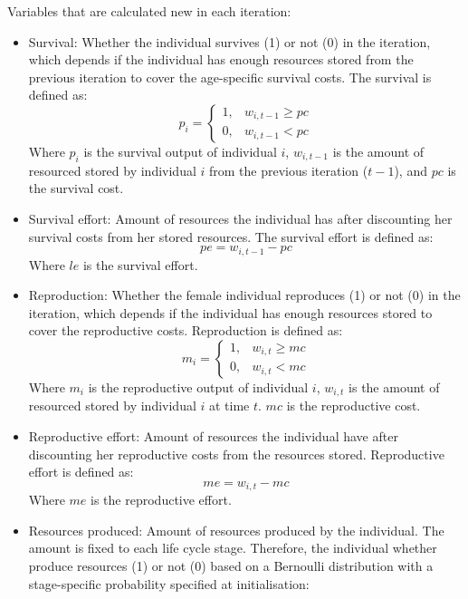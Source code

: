 \documentclass{article}
\begin{document}
Variables that are calculated new in each iteration:
    \begin{itemize}
        \item Survival: Whether the individual survives (1) or not (0) in the iteration, which depends if the individual has enough resources stored from the previous iteration to cover the age-specific survival costs. The survival is defined as:
\begin{equation}
    p_i=\begin{cases}
    1,& w_{i,t-1} \geq pc\\
    0,& w_{i,t-1} < pc
\end{cases}
\end{equation}
        Where $p_i$ is the survival output of individual $i$, $w_{i,t-1}$ is the amount of resourced stored by individual $i$ from the previous iteration ($t-1$), and $pc$ is the survival cost.
        \item Survival effort: Amount of resources the individual has after discounting her survival costs from her stored resources. The survival effort is defined as:
\begin{equation}
    pe=w_{i,t-1} - pc
\end{equation}
        Where $le$ is the survival effort.
        \item Reproduction: Whether the female individual reproduces (1) or not (0) in the iteration, which depends if the individual has enough resources stored to cover the reproductive costs. Reproduction is defined as:
\begin{equation}
    m_i=\begin{cases}
    1,& w_{i,t} \geq mc\\
    0,& w_{i,t} < mc
\end{cases}
\end{equation}
        Where $m_i$ is the reproductive output of individual $i$, $w_{i,t}$ is the amount of resourced stored by individual $i$ at time $t$. $mc$ is the reproductive cost.
        \item Reproductive effort: Amount of resources the individual have after discounting her reproductive costs from the resources stored. Reproductive effort is defined as:
\begin{equation}
    me=w_{i,t} - mc
\end{equation}
        Where $me$ is the reproductive effort.
        \item Resources produced: Amount of resources produced by the individual. The amount is fixed to each life cycle stage. Therefore, the individual whether produce resources (1) or not (0) based on a Bernoulli distribution with a stage-specific probability specified at initialisation:

\end{itemize}
\end{document}
